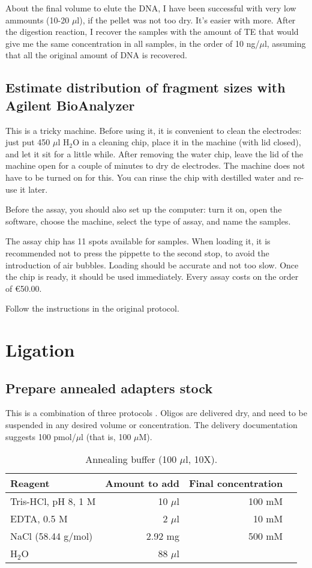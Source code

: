 \documentclass[a4paper,12pt]{article}
\begin{document}
About the final volume to elute the DNA, I have been successful with very low ammounts (10-20 $\mu$l), if the pellet was not too dry. It's easier with more. After the digestion reaction, I recover the samples with the amount of TE that would give me the same concentration in all samples, in the order of 10 ng/$\mu$l, assuming that all the original amount of DNA is recovered.

\subsection{Estimate distribution of fragment sizes with Agilent BioAnalyzer}
This is a tricky machine. Before using it, it is convenient to clean the electrodes: just put 450 $\mu$l H$_2$O in a cleaning chip, place it in the machine (with lid closed), and let it sit for a little while. After removing the water chip, leave the lid of the machine open for a couple of minutes to dry de electrodes. The machine does not have to be turned on for this. You can rinse the chip with destilled water and re-use it later.

Before the assay, you should also set up the computer: turn it on, open the software, choose the machine, select the type of assay, and name the samples.

The assay chip has 11 spots available for samples. When loading it, it is recommended not to press the pippette to the second stop, to avoid the introduction of air bubbles. Loading should be accurate and not too slow. Once the chip is ready, it should be used immediately. Every assay costs on the order of \euro{}50.00.

Follow the instructions in the original protocol.

\section{Ligation}
\subsection{Prepare annealed adapters stock}
This is a combination of three protocols \cite{Andolfatto2011,Etter2011,Peterson2012}. Oligos are delivered dry, and need to be suspended in any desired volume or concentration. The delivery documentation suggests 100 pmol/$\mu$l (that is, 100 $\mu$M).

\begin{table}
\caption{Annealing buffer (100 $\mu$l, 10X).}\label{tau:buffer}
\vspace*{0.3cm}
\begin{tabular}{lrrr}
\toprule
Reagent&Amount to add&Final concentration\\
\midrule
Tris-HCl, pH 8, 1 M&10 $\mu$l&100 mM\\
EDTA, 0.5 M&2 $\mu$l&10 mM\\
NaCl (58.44 g/mol)&2.92 mg&500 mM\\
H$_2$O&88 $\mu$l&\\
\bottomrule
\end{tabular}
\end{table}
\end{document}
